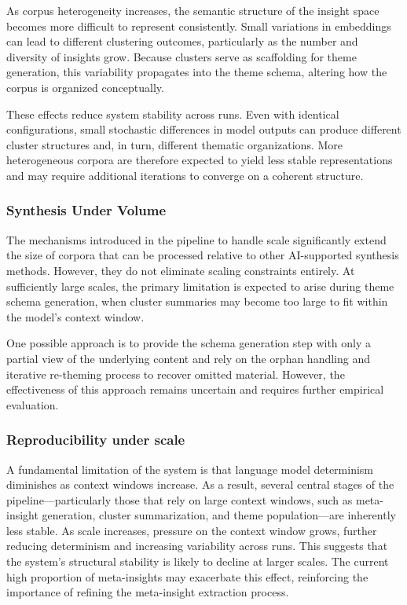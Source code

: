 \documentclass[
  11pt,
]{article}
\begin{document}
As corpus heterogeneity increases, the semantic structure of the insight
space becomes more difficult to represent consistently. Small variations
in embeddings can lead to different clustering outcomes, particularly as
the number and diversity of insights grow. Because clusters serve as
scaffolding for theme generation, this variability propagates into the
theme schema, altering how the corpus is organized conceptually.

These effects reduce system stability across runs. Even with identical
configurations, small stochastic differences in model outputs can
produce different cluster structures and, in turn, different thematic
organizations. More heterogeneous corpora are therefore expected to
yield less stable representations and may require additional iterations
to converge on a coherent structure.

\subsubsection{Synthesis Under Volume}\label{synthesis-under-volume}

The mechanisms introduced in the pipeline to handle scale significantly
extend the size of corpora that can be processed relative to other
AI-supported synthesis methods. However, they do not eliminate scaling
constraints entirely. At sufficiently large scales, the primary
limitation is expected to arise during theme schema generation, when
cluster summaries may become too large to fit within the model's context
window.

One possible approach is to provide the schema generation step with only
a partial view of the underlying content and rely on the orphan handling
and iterative re-theming process to recover omitted material. However,
the effectiveness of this approach remains uncertain and requires
further empirical evaluation.

\subsubsection{Reproducibility under
scale}\label{reproducibility-under-scale}

A fundamental limitation of the system is that language model
determinism diminishes as context windows increase. As a result, several
central stages of the pipeline---particularly those that rely on large
context windows, such as meta-insight generation, cluster summarization,
and theme population---are inherently less stable. As scale increases,
pressure on the context window grows, further reducing determinism and
increasing variability across runs. This suggests that the system's
structural stability is likely to decline at larger scales. The current
high proportion of meta-insights may exacerbate this effect, reinforcing
the importance of refining the meta-insight extraction process.
\end{document}
